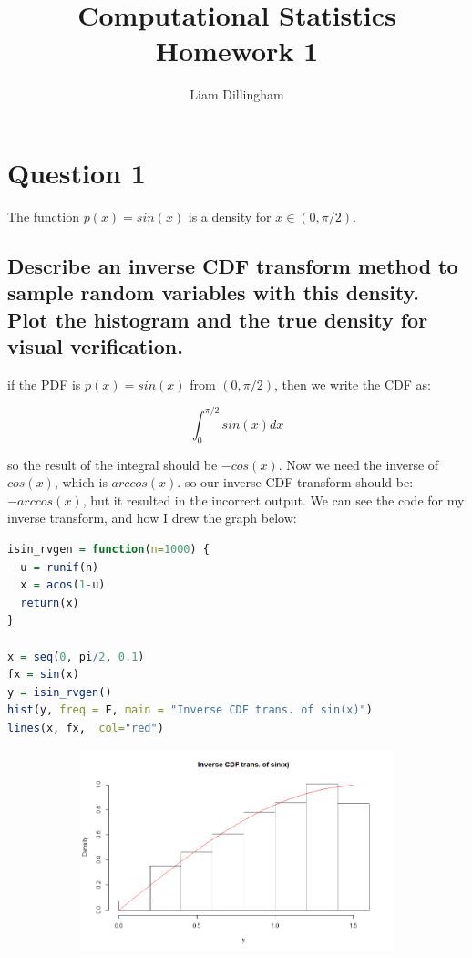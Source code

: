 \documentclass[20pt]{article} %
\title{Computational Statistics Homework 1}
\author{Liam Dillingham}
\begin{document}
\maketitle

\section{Question 1} 
The function $p(x) = sin(x)$ is a density for $x \in (0, \pi / 2)$.
\subsection{Describe an inverse CDF transform method to sample random variables with this density.  Plot the histogram and the true density for visual verification.}

if the PDF is $p(x) = sin(x)$ from $(0, \pi / 2)$, then we write the CDF as:

$$\int_{0}^{\pi / 2}sin(x)dx$$

so the result of the integral should be $-cos(x)$. Now we need the inverse of $cos(x)$, which is $arccos(x)$. so our inverse CDF transform should be: $-arccos(x)$, but it resulted in the incorrect output.  We can see the code for my inverse transform, and how I drew the graph below:

\begin{lstlisting}[language=R]
isin_rvgen = function(n=1000) {
  u = runif(n)
  x = acos(1-u)
  return(x)
}

x = seq(0, pi/2, 0.1)
fx = sin(x)
y = isin_rvgen()
hist(y, freq = F, main = "Inverse CDF trans. of sin(x)")
lines(x, fx,  col="red")
\end{lstlisting}

\newpage
\begin{figure}[!htbp]
  	\centering
   	\begin{subfigure}[p]{0.8\linewidth}
    	\includegraphics[width=\linewidth]{./figures/Rplot.png}
   	\end{subfigure}
\end{figure} 
\end{document}

